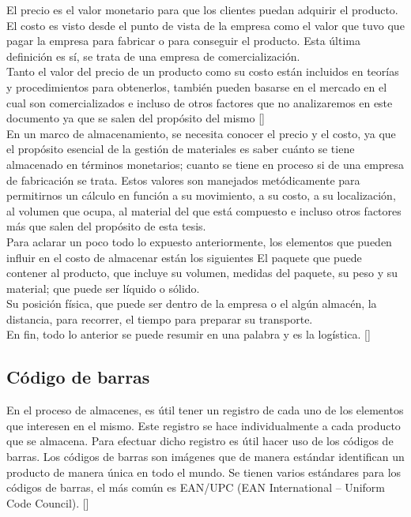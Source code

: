 El precio es el valor monetario para que los clientes puedan adquirir el producto. El costo es visto desde el punto de vista de la empresa como el valor que tuvo que pagar la empresa para fabricar o para conseguir el producto. Esta última definición es sí, se trata de una empresa de comercialización.\\

Tanto el valor del precio de un producto como su costo están incluidos en teorías y procedimientos para obtenerlos, también pueden basarse en el mercado en el cual son comercializados e incluso de otros factores que no analizaremos en este documento ya que se salen del propósito del mismo [\citep{PrinStraMark}]\\

En un marco de almacenamiento, se necesita conocer el precio y el costo, ya que el propósito esencial de la gestión de materiales es saber cuánto se tiene almacenado en términos monetarios; cuanto se tiene en proceso si de una empresa de fabricación se trata. Estos valores son manejados metódicamente para permitirnos un cálculo en función a su movimiento, a su costo, a su localización, al volumen que ocupa, al material del que está compuesto e incluso otros factores más que salen del propósito de esta tesis.\\

Para aclarar un poco todo lo expuesto anteriormente, los elementos que pueden influir en el costo de almacenar están los siguientes
El paquete que puede contener al producto, que incluye su volumen, medidas del paquete, su peso y su material; que puede ser líquido o sólido.\\

Su posición física, que puede ser dentro de la empresa o el algún almacén, la distancia, para recorrer, el tiempo para preparar su transporte.\\

En fin, todo lo anterior se puede resumir en una palabra y es la logística. [\citet{LogAdmiCadSumi}]\\

\subsection{Código de barras}

En el proceso de almacenes, es útil tener un registro de cada uno de los elementos que interesen en el mismo. Este registro se hace individualmente a cada producto que se almacena. Para efectuar dicho registro es útil hacer uso de los códigos de barras. Los códigos de barras son imágenes que de manera estándar identifican un producto de manera única en todo el mundo.
Se tienen varios estándares para los códigos de barras, el más común es EAN/UPC (EAN International – Uniform Code Council). [\citep{BPS:2019:Online}]\\

